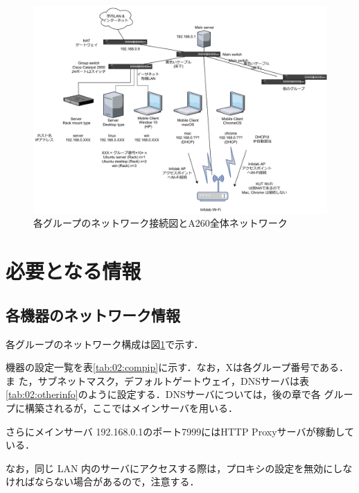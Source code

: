 \begin{figure}[tb]
    \centering
        \includegraphics[width=\textwidth]{01_os/system-network.pdf}
        \caption{各グループのネットワーク接続図とA260全体ネットワーク}
        \label{fig:01:system}
\end{figure}

\section{必要となる情報}

\subsection{各機器のネットワーク情報}
\label{proxy}

各グループのネットワーク構成は図\ref{fig:01:system}で示す．

機器の設定一覧を表\ref{tab:02:compip}に示す．なお，Xは各グループ番号である．ま
た，サブネットマスク，デフォルトゲートウェイ，DNSサーバは表
\ref{tab:02:otherinfo}のように設定する．DNSサーバについては，後の章で各
グループに構築されるが，ここではメインサーバを用いる．

さらにメインサーバ
192.168.0.1のポート7999にはHTTP Proxyサーバが稼動している．

なお，同じ LAN 内のサーバにアクセスする際は，プロキシの設定を無効にしな
ければならない場合があるので，注意する．

